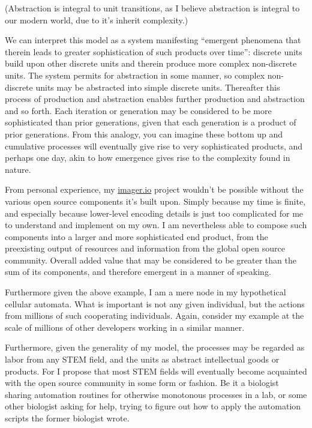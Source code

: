 \documentclass[american, 12pt]{article}
\begin{document}
(Abstraction is integral to unit transitions, as I believe abstraction is
integral to our modern world, due to it’s inherit complexity.)

We can interpret this model as a system manifesting “emergent phenomena that therein leads to greater sophistication of such products over time”: discrete units build upon other discrete units and therein produce more complex non-discrete units. The system permits for abstraction in some manner, so complex non-discrete units may be abstracted into simple discrete units. Thereafter this process of production and abstraction enables further production and abstraction and so forth. Each iteration or generation may be considered to be more sophisticated than prior generations, given that each generation is a product of prior generations. From this analogy, you can imagine these bottom up and cumulative processes will eventually give rise to very sophisticated products, and perhaps one day, akin to how emergence gives rise to the complexity found in nature.

From personal experience, my \url{imager.io} project wouldn’t be possible without the various open source components it’s built upon. Simply because my time is finite, and especially because lower-level encoding details is just too complicated for me to understand and implement on my own. I am nevertheless able to compose such components into a larger and more sophisticated end product, from the preexisting output of resources and information from the global open source community. Overall added value that may be considered to be greater than the sum of its components, and therefore emergent in a manner of speaking.

Furthermore given the above example, I am a mere node in my hypothetical cellular automata. What is important is not any given individual, but the actions from millions of such cooperating individuals. Again, consider my example at the scale of millions of other developers working in a similar manner.

Furthermore, given the generality of my model, the processes may be regarded as labor from any STEM field, and the units as abstract intellectual goods or products. For I propose that most STEM fields will eventually become acquainted with the open source community in some form or fashion. Be it a biologist sharing automation routines for otherwise monotonous processes in a lab, or some other biologist asking for help, trying to figure out how to apply the automation scripts the former biologist wrote.
\end{document}
